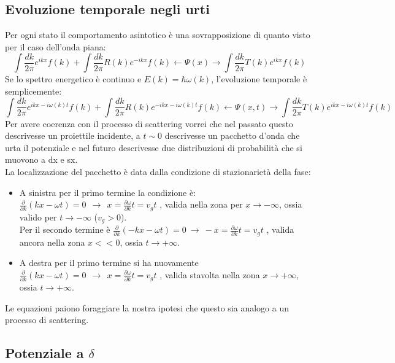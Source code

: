 \documentclass[twoside]{article}
\begin{document}
\subsection{Evoluzione temporale negli urti}
Per ogni stato il comportamento asintotico è una sovrapposizione di quanto visto per il caso dell'onda piana:
\begin{equation}
    \int\frac{dk}{2\pi}e^{ikx}f(k)+\int\frac{dk}{2\pi}R(k)e^{-ikx}f(k) \leftarrow \Psi(x) \rightarrow \int\frac{dk}{2\pi}T(k)e^{ikx}f(k)
\end{equation}
Se lo spettro energetico è continuo e $E(k)=\hbar \omega(k)$, l'evoluzione temporale è semplicemente:
\begin{equation}
    \int\frac{dk}{2\pi}e^{ikx-i\omega(k)t}f(k)+\int\frac{dk}{2\pi}R(k)e^{-ikx-i\omega(k)t}f(k) \leftarrow \Psi(x,t) \rightarrow \int\frac{dk}{2\pi}T(k)e^{ikx-i\omega(k)t}f(k)
\end{equation}
Per avere coerenza con il processo di scattering vorrei che nel passato questo descrivesse un proiettile incidente, a $t\sim 0$ descrivesse un pacchetto d'onda che urta il potenziale e nel futuro descrivesse due distribuzioni di probabilità che si muovono a dx e sx.
\\ 
La localizzazione del pacchetto è data dalla condizione di stazionarietà della fase:
\begin{itemize}
    \item A sinistra per il primo termine la condizione è: $\frac{\partial}{\partial k}(kx-\omega t)=0 \ \ \rightarrow \ \ x=\frac{\partial \omega}{\partial k}t=v_g t$ , valida nella zona per $x \rightarrow -\infty$, ossia valido per $t\rightarrow-\infty$ ($v_g > 0$). \\
    Per il secondo termine è $\frac{\partial}{\partial k}(-kx-\omega t)=0 \ \rightarrow \ -x=\frac{\partial \omega}{\partial k}t=v_g t$ , valida ancora nella zona $x << 0$, ossia $t\rightarrow +\infty$.
    \item A destra per il primo termine si ha nuovamente $\frac{\partial}{\partial k}(kx-\omega t)=0 \ \ \rightarrow \ \ x=\frac{\partial \omega}{\partial k}t=v_g t$ , valida stavolta nella zona $x \rightarrow +\infty$, ossia $t\rightarrow +\infty$.
\end{itemize}
Le equazioni paiono foraggiare la nostra ipotesi che questo sia analogo a un processo di scattering.

\vspace{0.5cm}

\subsection{Potenziale a \texorpdfstring{$\delta$}{Lg}}
\end{document}

